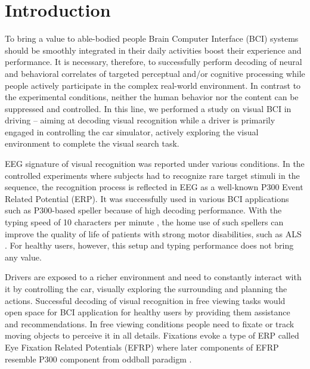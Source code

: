 \documentclass[12pt]{iopart}
\begin{document}
\section{Introduction}
\label{sec:intro}


To bring a value to able-bodied people 
Brain Computer Interface (BCI) systems should be smoothly 
integrated in their daily activities boost their experience and performance. 
It is necessary, therefore, to successfully perform decoding
of neural and behavioral correlates of targeted perceptual
and/or cognitive processing while people actively participate
in the complex real-world environment. In contrast to the
experimental conditions, neither 
the human behavior nor the content can be suppressed and controlled.
In this line, we performed a study on visual BCI in
driving -- aiming at decoding visual recognition
while a driver is primarily engaged in controlling the car simulator,
actively exploring the visual environment to complete the visual search task.

EEG signature of visual recognition was reported
under various conditions.
In the controlled experiments where subjects had to recognize
rare target stimuli in the sequence, the recognition process
is reflected in EEG as a well-known P300 Event Related Potential (ERP).
It was successfully used in various BCI applications such as
P300-based speller because of high decoding performance.
With the typing speed of 10 characters per minute \cite{rezeika_braincomputer_2018},
the home use of such spellers can improve the quality of life
of patients with strong motor disabilities, such as ALS \cite{sellers_brain-computer_2010,holz_long-term_2015}.
For healthy users, however, this setup and typing performance does not bring any value.

Drivers are exposed to a richer environment and need to constantly interact with it
by controlling the car, visually exploring the surrounding and
planning the actions. 
Successful decoding of visual recognition in free viewing tasks
would open space for BCI application for healthy users
by providing them assistance and recommendations.
In free viewing conditions people need to fixate
or track moving objects to perceive it in all details.
Fixations evoke a type of ERP called Eye Fixation Related Potentials (EFRP)
where later components of EFRP resemble P300 component from oddball paradigm \cite{brouwer_distinguishing_2013}.
\end{document}
